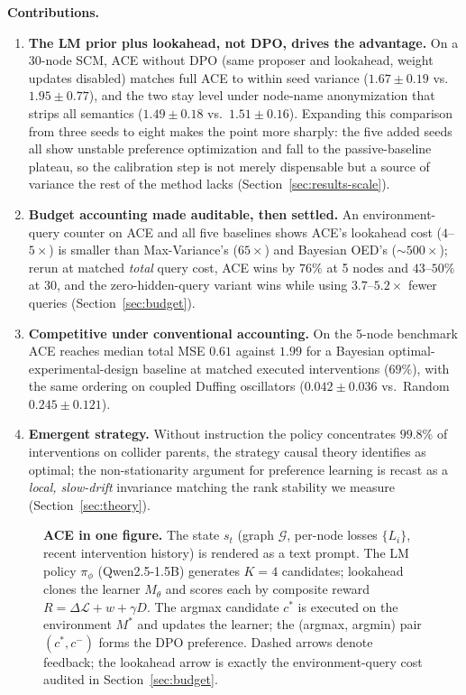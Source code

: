 \documentclass[twoside]{article}
\theoremstyle{plain}
\theoremstyle{definition}
\theoremstyle{remark}
\begin{document}
\textbf{Contributions.}
\begin{enumerate}[leftmargin=1.5em,topsep=0.2em,itemsep=0.1em]
\item \textbf{The LM prior plus lookahead, not DPO, drives the advantage.} On a 30-node SCM, ACE without DPO (same proposer and lookahead, weight updates disabled) matches full ACE to within seed variance ($1.67\pm0.19$ vs.\ $1.95\pm0.77$), and the two stay level under node-name anonymization that strips all semantics ($1.49\pm0.18$ vs.\ $1.51\pm0.16$). Expanding this comparison from three seeds to eight makes the point more sharply: the five added seeds all show unstable preference optimization and fall to the passive-baseline plateau, so the calibration step is not merely dispensable but a source of variance the rest of the method lacks (Section~\ref{sec:results-scale}).
\item \textbf{Budget accounting made auditable, then settled.} An environment-query counter on ACE and all five baselines shows ACE's lookahead cost ($4$--$5\times$) is smaller than Max-Variance's ($65\times$) and Bayesian OED's ($\sim\!500\times$); rerun at matched \emph{total} query cost, ACE wins by $76\%$ at 5 nodes and $43$--$50\%$ at 30, and the zero-hidden-query variant wins while using $3.7$--$5.2\times$ fewer queries (Section~\ref{sec:budget}).
\item \textbf{Competitive under conventional accounting.} On the 5-node benchmark ACE reaches median total MSE $0.61$ against $1.99$ for a Bayesian optimal-experimental-design baseline at matched executed interventions ($69\%$), with the same ordering on coupled Duffing oscillators ($0.042\pm0.036$ vs.\ Random $0.245\pm0.121$).
\item \textbf{Emergent strategy.} Without instruction the policy concentrates $99.8\%$ of interventions on collider parents, the strategy causal theory identifies as optimal; the non-stationarity argument for preference learning is recast as a \emph{local, slow-drift} invariance matching the rank stability we measure (Section~\ref{sec:theory}).
\end{enumerate}

\begin{figure}[t]
\centering
\resizebox{0.80\linewidth}{!}{}
\caption{\textbf{ACE in one figure.} The state $s_t$ (graph $\mathcal{G}$, per-node losses $\{L_i\}$, recent intervention history) is rendered as a text prompt. The LM policy $\pi_\phi$ (Qwen2.5-1.5B) generates $K{=}4$ candidates; lookahead clones the learner $M_\theta$ and scores each by composite reward $R = \Delta\mathcal{L} + w + \gamma D$. The argmax candidate $c^{*}$ is executed on the environment $M^{*}$ and updates the learner; the (argmax, argmin) pair $(c^{*}, c^{-})$ forms the DPO preference. Dashed arrows denote feedback; the lookahead arrow is exactly the environment-query cost audited in Section~\ref{sec:budget}.}
\label{fig:framework}
\end{figure}
\end{document}
